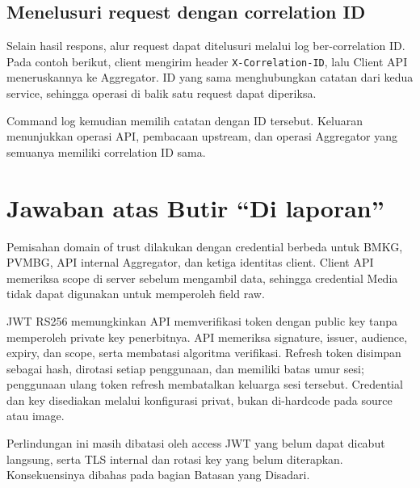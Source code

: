 \subsection{Menelusuri request dengan correlation ID}
Selain hasil respons, alur request dapat ditelusuri melalui log ber-correlation ID. Pada contoh berikut, client mengirim header \texttt{X-Correlation-ID}, lalu Client API meneruskannya ke Aggregator. ID yang sama menghubungkan catatan dari kedua service, sehingga operasi di balik satu request dapat diperiksa.

Command log kemudian memilih catatan dengan ID tersebut. Keluaran menunjukkan operasi API, pembacaan upstream, dan operasi Aggregator yang semuanya memiliki correlation ID sama.

\section{Jawaban atas Butir ``Di laporan''}
\label{sec:p3-di-laporan}
Pemisahan domain of trust dilakukan dengan credential berbeda untuk BMKG, PVMBG, API internal Aggregator, dan ketiga identitas client. Client API memeriksa scope di server sebelum mengambil data, sehingga credential Media tidak dapat digunakan untuk memperoleh field raw.

JWT RS256 memungkinkan API memverifikasi token dengan public key tanpa memperoleh private key penerbitnya. API memeriksa signature, issuer, audience, expiry, dan scope, serta membatasi algoritma verifikasi. Refresh token disimpan sebagai hash, dirotasi setiap penggunaan, dan memiliki batas umur sesi; penggunaan ulang token refresh membatalkan keluarga sesi tersebut. Credential dan key disediakan melalui konfigurasi privat, bukan di-hardcode pada source atau image.

Perlindungan ini masih dibatasi oleh access JWT yang belum dapat dicabut langsung, serta TLS internal dan rotasi key yang belum diterapkan. Konsekuensinya dibahas pada bagian Batasan yang Disadari.
